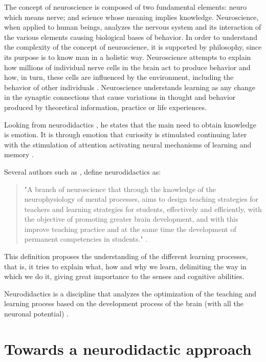 \documentclass[english]{textolivre}
\begin{document}
The concept of neuroscience is composed of two fundamental elements: neuro which means nerve; and science whose meaning implies knowledge. Neuroscience, when applied to human beings, analyzes the nervous system and its interaction of the various elements causing biological bases of behavior. In order to understand the complexity of the concept of neuroscience, it is supported by philosophy, since its purpose is to know man in a holistic way. Neuroscience attempts to explain how millions of individual nerve cells in the brain act to produce behavior and how, in turn, these cells are influenced by the environment, including the behavior of other individuals \cite{salas_silva_educacion_2003}. Neuroscience understands learning as any change in the synaptic connections that cause variations in thought and behavior produced by theoretical information, practice or life experiences.

Looking from neurodidactics \cite{unzueta_educacion_2011}, he states that the main need to obtain knowledge is emotion. It is through emotion that curiosity is stimulated continuing later with the stimulation of attention activating neural mechanisms of learning and memory \cite{mora_dios_2014,benavidez__importancia_2019}.

Several authors such as \textcite{ortiz_aportes_2018}, define neurodidactics as:
\begin{quote}
    "A branch of neuroscience that through the knowledge of the neurophysiology of mental processes, aims to design teaching strategies for teachers and learning strategies for students, effectively and efficiently, with the objective of promoting greater brain development, and with this improve teaching practice and at the same time the development of permanent competencies in students." \cite[p.~10]{ortiz_aportes_2018}.
\end{quote}
	
This definition proposes the understanding of the different learning processes, that is, it tries to explain what, how and why we learn, delimiting the way in which we do it, giving great importance to the senses and cognitive abilities.

Neurodidactics is a discipline that analyzes the optimization of the teaching and learning process based on the development process of the brain (with all the neuronal potential) \cite{alarcon_neurodidactica_2020}.

\section{Towards a neurodidactic approach}
\end{document}
